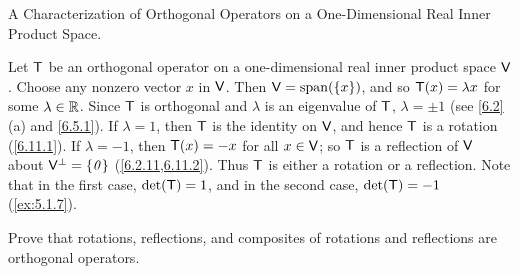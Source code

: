 \begin{eg}\label{6.11.3}
  A Characterization of Orthogonal Operators on a One-Dimensional Real Inner Product Space.

  Let \(\mathsf{T}\) be an orthogonal operator on a one-dimensional real inner product space \(\mathsf{V}\).
  Choose any nonzero vector \(x\) in \(\mathsf{V}\).
  Then \(\V = \spn{\set{x}}\), and so \(\mathsf{T}(x) = \lambda x\) for some \(\lambda \in \mathbb{R}\).
  Since \(\mathsf{T}\) is orthogonal and \(\lambda\) is an eigenvalue of \(\mathsf{T}\), \(\lambda = \pm 1\) (see \cref{6.2}(a) and \cref{6.5.1}).
  If \(\lambda = 1\), then \(\mathsf{T}\) is the identity on \(\mathsf{V}\), and hence \(\mathsf{T}\) is a rotation (\cref{6.11.1}).
  If \(\lambda = -1\), then \(\mathsf{T}(x) = -x\) for all \(x \in \mathsf{V}\);
  so \(\mathsf{T}\) is a reflection of \(\mathsf{V}\) about \(\mathsf{V}^{\perp} = \left\lbrace\mathit{0}\right\rbrace\) (\cref{6.2.11,6.11.2}).
  Thus \(\mathsf{T}\) is either a rotation or a reflection.
  Note that in the first case, \(\det(\mathsf{T}) = 1\), and in the second case, \(\det(\mathsf{T}) = -1\) (\cref{ex:5.1.7}).
\end{eg}

\exercisesection

\setcounter{ex}{1}
\begin{ex}\label{ex:6.11.2}
  Prove that rotations, reflections, and composites of rotations and reflections are orthogonal operators.
\end{ex}


